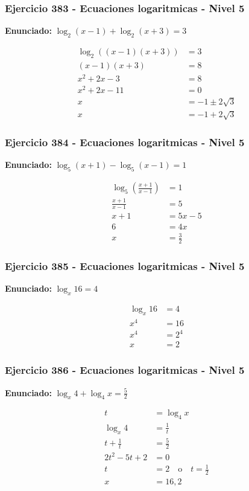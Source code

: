 \documentclass[12pt,a4paper]{article}
\begin{document}
\subsubsection*{Ejercicio 383 - Ecuaciones logaritmicas - Nivel 5}
\textbf{Enunciado:} \(\log_2(x-1)+\log_2(x+3)=3\)

\[
\begin{aligned}
\log_2((x-1)(x+3))&=3\\
(x-1)(x+3)&=8\\
x^2+2x-3&=8\\
x^2+2x-11&=0\\
x&=-1\pm2\sqrt3\\
x&=\boxed{-1+2\sqrt3}
\end{aligned}
\]


\subsubsection*{Ejercicio 384 - Ecuaciones logaritmicas - Nivel 5}
\textbf{Enunciado:} \(\log_5(x+1)-\log_5(x-1)=1\)

\[
\begin{aligned}
\log_5\left(\frac{x+1}{x-1}\right)&=1\\
\frac{x+1}{x-1}&=5\\
x+1&=5x-5\\
6&=4x\\
x&=\boxed{\frac32}
\end{aligned}
\]


\subsubsection*{Ejercicio 385 - Ecuaciones logaritmicas - Nivel 5}
\textbf{Enunciado:} \(\log_x16=4\)

\[
\begin{aligned}
\log_x16&=4\\
x^4&=16\\
x^4&=2^4\\
x&=\boxed{2}
\end{aligned}
\]


\subsubsection*{Ejercicio 386 - Ecuaciones logaritmicas - Nivel 5}
\textbf{Enunciado:} \(\log_x4+\log_4x=\frac52\)

\[
\begin{aligned}
t&=\log_4x\\
\log_x4&=\frac1t\\
t+\frac1t&=\frac52\\
2t^2-5t+2&=0\\
t&=2\quad \text{o}\quad t=\frac12\\
x&=\boxed{16,2}
\end{aligned}
\]
\end{document}
